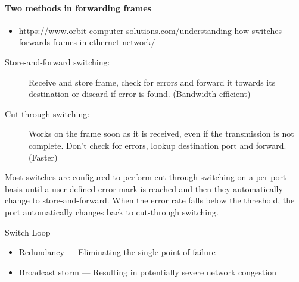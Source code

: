 \paragraph{Two methods in forwarding frames}
\begin{itemize}
\item \url{https://www.orbit-computer-solutions.com/understanding-how-switches-forwards-frames-in-ethernet-network/}
\end{itemize}
\begin{description}
\item[Store-and-forward switching:] Receive and store frame, check for errors and forward
  it towards its destination or discard if error is found. (Bandwidth efficient)
\item[Cut-through switching:] Works on the frame soon as it is received, even if the
  transmission is not complete. Don't check for errors, lookup destination port and
  forward. (Faster)
\end{description}
Most switches are configured to perform cut-through switching on a per-port basis until a
user-defined error mark is reached and then they automatically change to
store-and-forward. When the error rate falls below the threshold, the port automatically
changes back to cut-through switching.

\begin{frame}{Switch Loop}
  \begin{itemize}
  \item[{\Large \good}] Redundancy --- Eliminating the single point of failure
  \item[{\Large \textcolor{red}{\bad}}] Broadcast storm --- Resulting in potentially severe network congestion
  \end{itemize}
  \begin{center}
  \end{center}
\end{frame}

